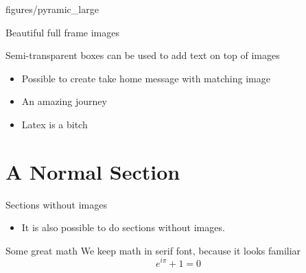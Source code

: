 \documentclass{beamer}
\begin{document}
\begin{fullframe}{figures/pyramic_large}
  \begin{tcolorbox}
    \huge \centering Beautiful full frame images

    \normalsize Semi-transparent boxes can be used to add text on top of images
  \end{tcolorbox}
\end{fullframe}

\begin{takehome}
  \begin{itemize}
    \item Possible to create \alert{take home message} with matching image
    \item An amazing journey
    \item Latex is a bitch
  \end{itemize}
\end{takehome}

\section{A Normal Section}

\begin{frame}{Sections without images}
  \begin{itemize}
    \item It is also possible to do sections without images.
  \end{itemize}
\end{frame}

\begin{frame}{Some great math}
  We keep math in serif font, because it looks familiar
  \begin{equation*}
    e^{i\pi} + 1 = 0
  \end{equation*}
\end{frame}
\end{document}
